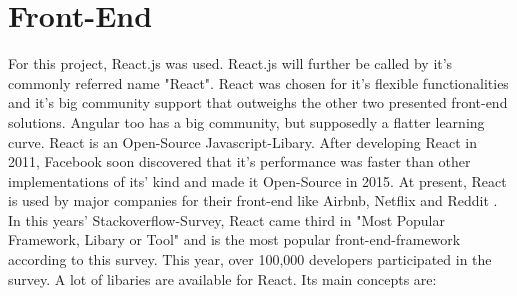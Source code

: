 \section{Front-End}
For this project, React.js was used. 
React.js will further be called by it's commonly referred name "React".
React was chosen for it's flexible functionalities and it's big community support that outweighs the other two presented front-end solutions.
Angular too has a big community, but supposedly a flatter learning curve.
React is an Open-Source Javascript-Libary. 
After developing React in 2011, Facebook soon discovered that it's performance was faster than other implementations of its' kind \parencite{benchmarkReact}and made it Open-Source in 2015. 
At present, React is used by major companies for their front-end like Airbnb, Netflix and Reddit \parencite{reactjsUsers}. 
In this years' Stackoverflow-Survey, React came third in "Most Popular Framework, Libary or Tool" \parencite{stackOverflowSurvey} and is the most popular front-end-framework according to this survey. 
This year, over 100,000 developers participated in the survey. 
A lot of libaries are available for React. 
Its main concepts are:


